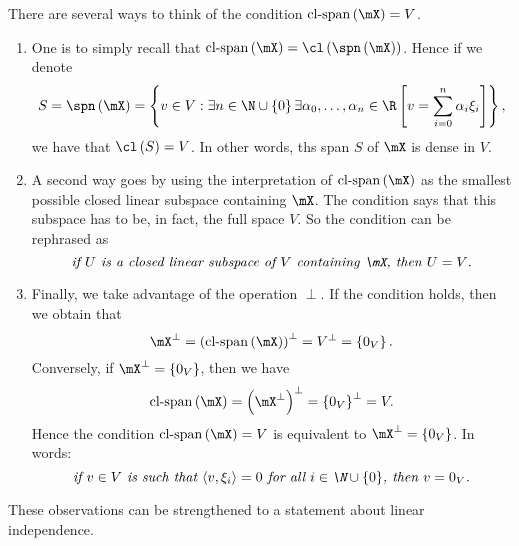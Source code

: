 \documentclass[pmath450]{subfiles}
\begin{document}
    There are several ways to think of the condition $\clspn\left( \mX \right)=V$.
    \begin{enumerate}
        \item One is to simply recall that $\clspn\left( \mX \right) = \cl\left( \spn\left( \mX \right) \right)$. Hence if we denote
            \begin{equation}
                S = \spn\left( \mX \right) = \left\lbrace v\in V: \exists n\in\N\cup\left\lbrace 0 \right\rbrace\exists\alpha_0,\ldots,\alpha_n\in\R\left[ v = \sum^{n}_{i=0}\alpha_i\xi_i \right] \right\rbrace,
            \end{equation}
            we have that $\cl\left( S \right)=V$. In other words, ths span $S$ of $\mX$ is dense in $V$.
        \item A second way goes by using the interpretation of $\clspn\left( \mX \right)$ as the smallest possible closed linear subspace containing $\mX$. The condition says that this subspace has to be, in fact, the full space $V$. So the condition can be rephrased as
            \begin{equation}
                \text{\textit{if $U$ is a closed linear subspace of $V$ containing $\mX$, then $U=V$.}}
            \end{equation}
        \item Finally, we take advantage of the operation $\perp$. If the condition holds, then we obtain that
            \begin{equation*}
                \mX^{\perp} = \left( \clspn\left( \mX \right) \right)^{\perp} = V^{\perp} = \left\lbrace 0_V \right\rbrace.
            \end{equation*}
            Conversely, if $\mX^{\perp}=\left\lbrace 0_V \right\rbrace$, then we have
            \begin{equation*}
                \clspn\left( \mX \right) = \left( \mX^{\perp} \right)^{\perp} = \left\lbrace 0_V \right\rbrace^{\perp} = V.
            \end{equation*}
            Hence the condition $\clspn\left( \mX \right) = V$ is equivalent to $\mX^{\perp} = \left\lbrace 0_V \right\rbrace$. In words:
            \begin{equation}
                \text{\textit{if $v\in V$ is such that $\left\langle v, \xi_i\right\rangle=0$ for all $i\in\N\cup\left\lbrace 0 \right\rbrace$, then $v=0_V$.}}
            \end{equation}
    \end{enumerate}
    These observations can be strengthened to a statement about linear independence.
\end{document}
